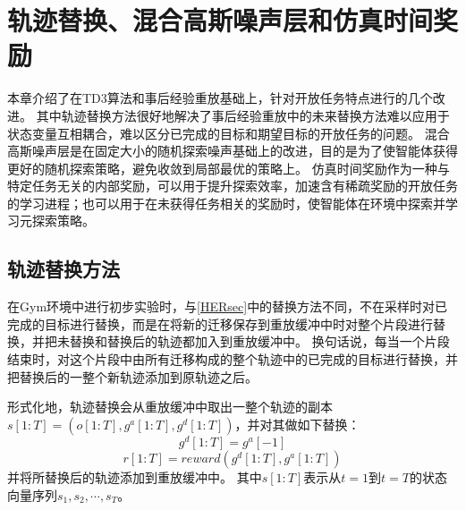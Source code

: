 \chapter{轨迹替换、混合高斯噪声层和仿真时间奖励}
本章介绍了在TD3算法和事后经验重放基础上，针对开放任务特点进行的几个改进。
其中轨迹替换方法很好地解决了事后经验重放中的未来替换方法难以应用于状态变量互相耦合，难以区分已完成的目标和期望目标的开放任务的问题。
混合高斯噪声层是在固定大小的随机探索噪声基础上的改进，目的是为了使智能体获得更好的随机探索策略，避免收敛到局部最优的策略上。
仿真时间奖励作为一种与特定任务无关的内部奖励，可以用于提升探索效率，加速含有稀疏奖励的开放任务的学习进程；也可以用于在未获得任务相关的奖励时，使智能体在环境中探索并学习元探索策略。
\section{轨迹替换方法}

在Gym环境中进行初步实验时，与\ref{HERsec}中的替换方法不同，不在采样时对已完成的目标进行替换，而是在将新的迁移保存到重放缓冲中时对整个片段进行替换，并把未替换和替换后的轨迹都加入到重放缓冲中。
换句话说，每当一个片段结束时，对这个片段中由所有迁移构成的整个轨迹中的已完成的目标进行替换，并把替换后的一整个新轨迹添加到原轨迹之后。

形式化地，轨迹替换会从重放缓冲中取出一整个轨迹的副本$s[1:T]=(o[1:T], g^a[1:T], g^d[1:T])$，并对其做如下替换：
$$g^d[1:T]=g^a[-1]$$
$$r[1:T]=reward(g^d[1:T], g^a[1:T])$$
并将所替换后的轨迹添加到重放缓冲中。
其中$s[1:T]$表示从$t=1$到$t=T$的状态向量序列$s_1, s_2, \cdots, s_T$。

